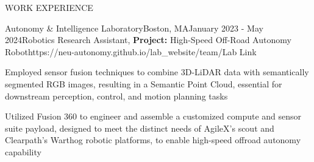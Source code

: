 \documentclass{resume} %
\begin{document}
\begin{rSection}{WORK EXPERIENCE}
\begin{rProjExpDetails}{Autonomy \& Intelligence Laboratory}{Boston, MA}{January 2023 - May 2024}{Robotics Research Assistant, \textbf{Project:} High-Speed Off-Road Autonomy Robot}{https://neu-autonomy.github.io/lab_website/team/}{Lab Link}
		\item Employed sensor fusion techniques to combine 3D-LiDAR data with semantically segmented RGB images, resulting in a Semantic Point Cloud, essential for downstream perception, control, and motion planning tasks
		\item Utilized Fusion 360 to engineer and assemble a customized compute and sensor suite payload, designed to meet the distinct needs of AgileX's scout and Clearpath's Warthog robotic platforms, to enable high-speed offroad autonomy capability
	\end{rProjExpDetails}


\end{rSection}
\end{document}

